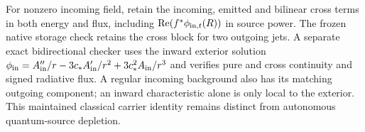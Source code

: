 For nonzero incoming field, retain the incoming, emitted and bilinear cross
terms in both energy and flux, including
$\operatorname{Re}(f^*\phi_{{\rm in},t}(R))$ in source power. The frozen native storage check retains the cross block for two outgoing
jets. A separate exact bidirectional checker uses the inward exterior
solution $\phi_{\rm in}=A_{\rm in}''/r-3c_*A_{\rm in}'/r^2+
3c_*^2A_{\rm in}/r^3$ and verifies pure and cross continuity and signed
radiative flux. A regular incoming background also has its matching
outgoing component; an inward characteristic alone is only local to the exterior. This maintained classical carrier
identity remains distinct from autonomous quantum-source depletion.
